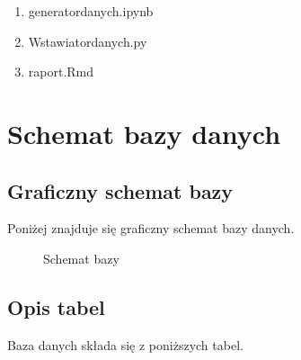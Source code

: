 \documentclass{article}
\begin{document}
	\begin{enumerate}
		\item generator\textunderscore danych.ipynb
		\item Wstawiator\textunderscore danych.py
		\item raport.Rmd
	\end{enumerate}
	
	\section{Schemat bazy danych}
	
	\subsection{Graficzny schemat bazy}
	
	Poniżej znajduje się graficzny schemat bazy danych.
	
	\begin{figure}[H]
		\centering
		\caption{Schemat bazy}
	\end{figure}
	
	\subsection{Opis tabel}
	
	Baza danych składa się z poniższych tabel. 
	
\end{document}
